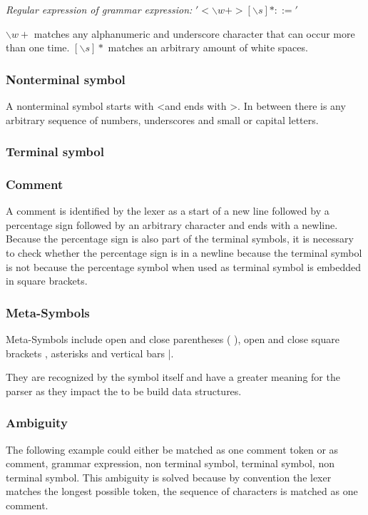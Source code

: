 \textit{Regular expression of grammar expression:}  $'<\backslash w+>[\backslash s]*::='$

$\backslash w+$ matches any alphanumeric and underscore character that can occur more than one time.
$[\backslash s]*$ matches an arbitrary amount of white spaces.

\subsubsection{Nonterminal symbol}

A nonterminal symbol starts with \dq <\dq and ends with \dq >\dq. In between there is any arbitrary sequence of numbers, underscores and small or capital letters.

\subsubsection{Terminal symbol}

\subsubsection{Comment}

A comment is identified by the lexer as a start of a new line followed by a percentage sign followed by an arbitrary character and ends with a newline. Because the percentage sign is also part of the terminal symbols, it is necessary to check whether the percentage sign is in a newline because the terminal symbol is not because the percentage symbol when used as terminal symbol is embedded in square brackets.    

\subsubsection{Meta-Symbols}

Meta-Symbols include open and close parentheses \dq( )\dq, open and close square brackets \dq[ ]\dq, asterisks \dq *\dq and vertical bars \dq |\dq.

They are recognized by the symbol itself and have a greater meaning for the parser as they impact the to be build data structures. 

\subsubsection{Ambiguity}

The following example could either be matched as one comment token or as comment, grammar expression, non terminal symbol, terminal symbol, non terminal symbol.
This ambiguity is solved because by convention the lexer matches the longest possible token, the sequence of characters is matched as one comment.
\begin{lstlisting}[basicstyle=\scriptsize	,caption= Commented out production rule,label= lst:Lexer_example]
%----   <formula_role> ::= <user_role>-<source>
\end{lstlisting}
